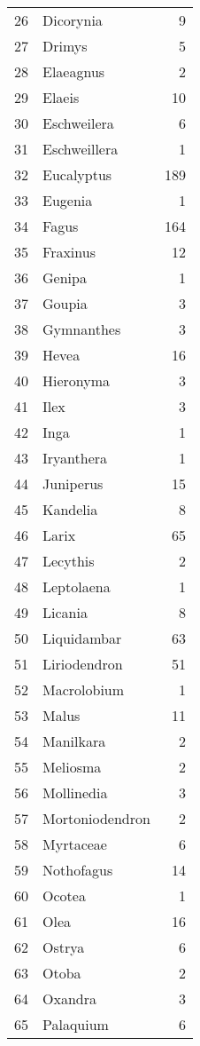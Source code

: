 \documentclass[]{article}
\begin{document}
\begin{table}[ht]
\begin{tabular}{rlr}
  26 & Dicorynia &   9 \\ 
  27 & Drimys &   5 \\ 
  28 & Elaeagnus &   2 \\ 
  29 & Elaeis &  10 \\ 
  30 & Eschweilera &   6 \\ 
  31 & Eschweillera &   1 \\ 
  32 & Eucalyptus & 189 \\ 
  33 & Eugenia &   1 \\ 
  34 & Fagus & 164 \\ 
  35 & Fraxinus &  12 \\ 
  36 & Genipa &   1 \\ 
  37 & Goupia &   3 \\ 
  38 & Gymnanthes &   3 \\ 
  39 & Hevea &  16 \\ 
  40 & Hieronyma &   3 \\ 
  41 & Ilex &   3 \\ 
  42 & Inga &   1 \\ 
  43 & Iryanthera &   1 \\ 
  44 & Juniperus &  15 \\ 
  45 & Kandelia &   8 \\ 
  46 & Larix &  65 \\ 
  47 & Lecythis &   2 \\ 
  48 & Leptolaena &   1 \\ 
  49 & Licania &   8 \\ 
  50 & Liquidambar &  63 \\ 
  51 & Liriodendron &  51 \\ 
  52 & Macrolobium &   1 \\ 
  53 & Malus &  11 \\ 
  54 & Manilkara &   2 \\ 
  55 & Meliosma &   2 \\ 
  56 & Mollinedia &   3 \\ 
  57 & Mortoniodendron &   2 \\ 
  58 & Myrtaceae &   6 \\ 
  59 & Nothofagus &  14 \\ 
  60 & Ocotea &   1 \\ 
  61 & Olea &  16 \\ 
  62 & Ostrya &   6 \\ 
  63 & Otoba &   2 \\ 
  64 & Oxandra &   3 \\ 
  65 & Palaquium &   6 \\ 

\end{tabular}
\end{table}
\end{document}
